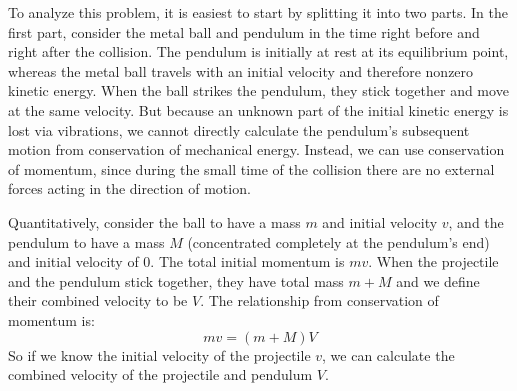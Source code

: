 To analyze this problem, it is easiest to start by splitting it into two parts. In the first part, consider the metal ball and pendulum in the time right before and right after the collision. The pendulum is initially at rest at its equilibrium point, whereas the metal ball travels with an initial velocity and therefore nonzero kinetic energy. When the ball strikes the pendulum, they stick together and move at the same velocity. But because an unknown part of the initial kinetic energy is lost via vibrations, we cannot directly calculate the pendulum's subsequent motion from conservation of mechanical energy.  Instead, we can use conservation of momentum, since during the small time of the collision there are no external forces acting in the direction of motion.\myskip
                   
Quantitatively, consider the ball to have a mass $m$ and initial velocity $v$, and the pendulum to have a mass $M$ (concentrated completely at the pendulum's end) and initial velocity of 0. The total initial momentum is $mv$. When the projectile and the pendulum stick together, they have total mass $m + M$ and we define their combined velocity to be $V$. The relationship from conservation of momentum is:
\begin{equation}
    mv = (m+M)V
\end{equation}
So if we know the initial velocity of the projectile $v$, we can calculate the combined velocity of the projectile and pendulum $V$.\myskip

